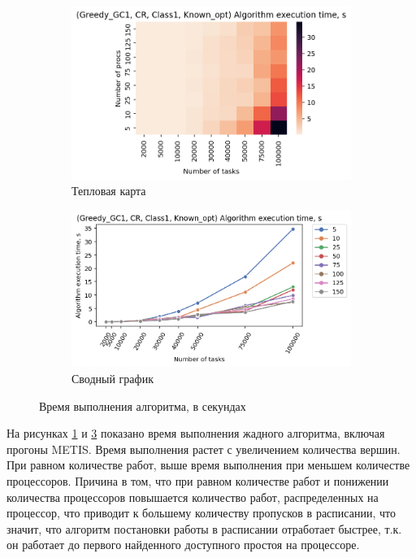 \begin{figure}[!htbp]
    \centering
    \begin{subfigure}{0.49\textwidth}
        \includegraphics[width=\textwidth]{imgs/ideal_1/CR/et_heatmap.png}
        \caption{Тепловая карта}
        \label{fig:CR-exec-time-heatmap}
    \end{subfigure}
    \hfill
    \begin{subfigure}{0.49\textwidth}
        \includegraphics[width=\textwidth]{imgs/ideal_1/CR/tr_graph.png}
        \caption{Сводный график}
        \label{fig:CR-exec-time-compiled}
    \end{subfigure}
    \caption{Время выполнения алгоритма, в секундах}
\end{figure}

На рисунках \ref{fig:CR-exec-time-heatmap} и \ref{fig:CR-exec-time-compiled} показано время выполнения жадного алгоритма, включая прогоны METIS. Время выполнения растет с увеличением количества вершин. При равном количестве работ, выше время выполнения при меньшем количестве процессоров. Причина в том, что при равном количестве работ и понижении количества процессоров повышается количество работ, распределенных на процессор, что приводит к большему количеству пропусков в расписании, что значит, что алгоритм постановки работы в расписании отработает быстрее, т.к. он работает до первого найденного доступного простоя на процессоре. 

